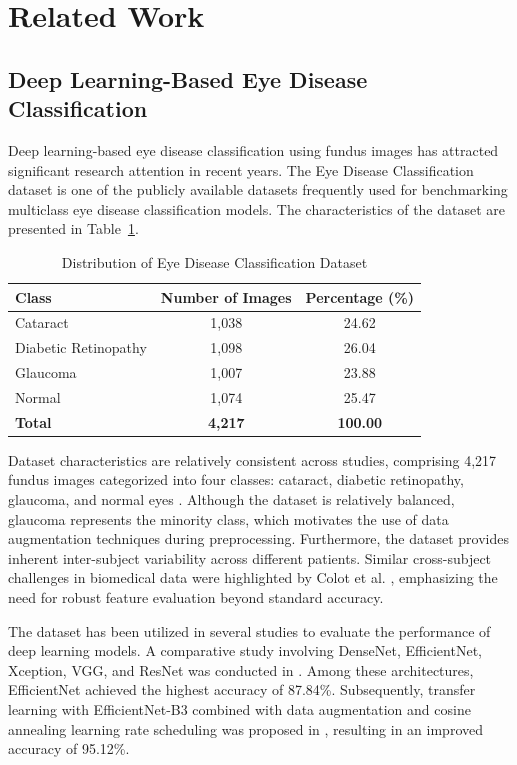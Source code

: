 \section{Related Work}
\subsection{Deep Learning-Based Eye Disease Classification}

Deep learning-based eye disease classification using fundus images has attracted significant research attention in recent years.
The Eye Disease Classification dataset \cite{dataset} is one of the publicly available datasets frequently used for benchmarking multiclass eye disease classification models.
The characteristics of the dataset are presented in Table~\ref{tab:dataset}.

\begin{table}[htbp]
\caption{Distribution of Eye Disease Classification Dataset}
\label{tab:dataset}
\centering
\begin{tabular*}{\columnwidth}{@{\extracolsep{\fill}}lcc@{}}
\toprule
\textbf{Class} & \textbf{Number of Images} & \textbf{Percentage (\%)} \\
\midrule
Cataract & 1,038 & 24.62 \\
Diabetic Retinopathy & 1,098 & 26.04 \\
Glaucoma & 1,007 & 23.88 \\
Normal & 1,074 & 25.47 \\
\midrule
\textbf{Total} & \textbf{4,217} & \textbf{100.00} \\
\bottomrule
\end{tabular*}
\end{table}

Dataset characteristics are relatively consistent across studies, comprising 4,217 fundus images categorized into four classes: cataract, diabetic retinopathy, glaucoma, and normal eyes \cite{erdas2024,jibon2025}.
Although the dataset is relatively balanced, glaucoma represents the minority class, which motivates the use of data augmentation techniques during preprocessing.
Furthermore, the dataset provides inherent inter-subject variability across different patients.
Similar cross-subject challenges in biomedical data were highlighted by Colot et al. \cite{Colot2023}, emphasizing the need for robust feature evaluation beyond standard accuracy.

The dataset has been utilized in several studies to evaluate the performance of deep learning models.
A comparative study involving DenseNet, EfficientNet, Xception, VGG, and ResNet was conducted in \cite{erdas2024}.
Among these architectures, EfficientNet achieved the highest accuracy of 87.84\%.
Subsequently, transfer learning with EfficientNet-B3 combined with data augmentation and cosine annealing learning rate scheduling was proposed in \cite{alsohemi2025}, resulting in an improved accuracy of 95.12\%.

